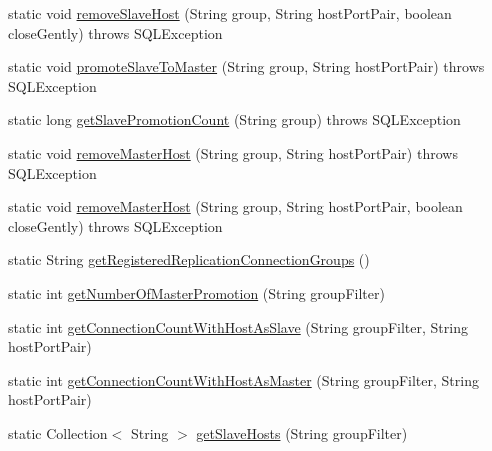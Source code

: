 \begin{DoxyCompactItemize}
\item 
static void \mbox{\hyperlink{classcom_1_1mysql_1_1cj_1_1jdbc_1_1ha_1_1_replication_connection_group_manager_a1d8eae072a3cf43947463b98c945dd20}{remove\+Slave\+Host}} (String group, String host\+Port\+Pair, boolean close\+Gently)  throws S\+Q\+L\+Exception 
\item 
static void \mbox{\hyperlink{classcom_1_1mysql_1_1cj_1_1jdbc_1_1ha_1_1_replication_connection_group_manager_adf67ffb0a336aecd39b6936be7deaca8}{promote\+Slave\+To\+Master}} (String group, String host\+Port\+Pair)  throws S\+Q\+L\+Exception 
\item 
static long \mbox{\hyperlink{classcom_1_1mysql_1_1cj_1_1jdbc_1_1ha_1_1_replication_connection_group_manager_aa28381ead622a40583691b7ada383e30}{get\+Slave\+Promotion\+Count}} (String group)  throws S\+Q\+L\+Exception 
\item 
static void \mbox{\hyperlink{classcom_1_1mysql_1_1cj_1_1jdbc_1_1ha_1_1_replication_connection_group_manager_a47b69ff67d0b5552beec03a98b4e1d15}{remove\+Master\+Host}} (String group, String host\+Port\+Pair)  throws S\+Q\+L\+Exception 
\item 
static void \mbox{\hyperlink{classcom_1_1mysql_1_1cj_1_1jdbc_1_1ha_1_1_replication_connection_group_manager_a8e92fdde01a589635b9ed2cb4b1e2704}{remove\+Master\+Host}} (String group, String host\+Port\+Pair, boolean close\+Gently)  throws S\+Q\+L\+Exception 
\item 
static String \mbox{\hyperlink{classcom_1_1mysql_1_1cj_1_1jdbc_1_1ha_1_1_replication_connection_group_manager_a668f8e9eedb98a9a18d8db7902cee1c5}{get\+Registered\+Replication\+Connection\+Groups}} ()
\item 
static int \mbox{\hyperlink{classcom_1_1mysql_1_1cj_1_1jdbc_1_1ha_1_1_replication_connection_group_manager_a4328ecd15b2cf6ab924a4f561a3ad5c8}{get\+Number\+Of\+Master\+Promotion}} (String group\+Filter)
\item 
static int \mbox{\hyperlink{classcom_1_1mysql_1_1cj_1_1jdbc_1_1ha_1_1_replication_connection_group_manager_a2595f787f9f013339bc1af1447c95a8b}{get\+Connection\+Count\+With\+Host\+As\+Slave}} (String group\+Filter, String host\+Port\+Pair)
\item 
static int \mbox{\hyperlink{classcom_1_1mysql_1_1cj_1_1jdbc_1_1ha_1_1_replication_connection_group_manager_a83bb1871d9ba4220c2ac4e6292ee2dad}{get\+Connection\+Count\+With\+Host\+As\+Master}} (String group\+Filter, String host\+Port\+Pair)
\item 
static Collection$<$ String $>$ \mbox{\hyperlink{classcom_1_1mysql_1_1cj_1_1jdbc_1_1ha_1_1_replication_connection_group_manager_a3afeb264ef3157d22e0d3fee778f08e2}{get\+Slave\+Hosts}} (String group\+Filter)

\end{DoxyCompactItemize}
